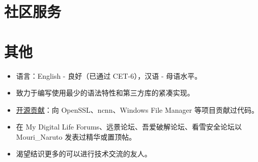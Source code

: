 \documentclass{resume}
\begin{document}
\section{社区服务}


\section{其他}
\begin{itemize}

  \item 语言：English - 良好（已通过 CET-6），汉语 - 母语水平。

  \item 致力于编写使用最少的语法特性和第三方库的紧凑实现。

  \item \href{https://github.com/search?q=is%3Apr+author%3AMouriNaruto&type=Issues}{开源贡献}：向 OpenSSL、ncnn、Windows File Manager 等项目贡献过代码。
  
  \item 在 My Digital Life Forums、远景论坛、吾爱破解论坛、看雪安全论坛以 Mouri\_Naruto 发表过精华或置顶帖。
  
  \item 渴望结识更多的可以进行技术交流的友人。
  
\end{itemize}
\end{document}

